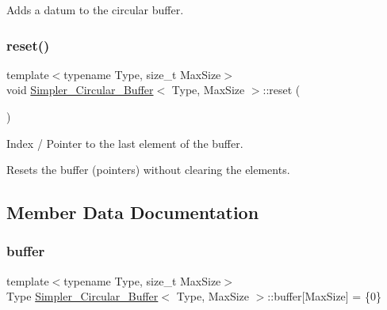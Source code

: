 Adds a datum to the circular buffer. 

\mbox{\label{classSimpler__Circular__Buffer_a793cdb8134afe48ef9918fa0428dfbb6}} 
\subsubsection{\texorpdfstring{reset()}{reset()}}
{\footnotesize\ttfamily template$<$typename Type, size\+\_\+t Max\+Size$>$ \\
void \hyperlink{classSimpler__Circular__Buffer}{Simpler\+\_\+\+Circular\+\_\+\+Buffer}$<$ Type, Max\+Size $>$\+::reset (\begin{DoxyParamCaption}{ }\end{DoxyParamCaption})\hspace{0.3cm}{\ttfamily [inline]}}



Index / Pointer to the last element of the buffer. 

Resets the buffer (pointers) without clearing the elements. 

\subsection{Member Data Documentation}
\mbox{\label{classSimpler__Circular__Buffer_a05808047d226985470e02e84b44bee9a}} 
\subsubsection{\texorpdfstring{buffer}{buffer}}
{\footnotesize\ttfamily template$<$typename Type, size\+\_\+t Max\+Size$>$ \\
Type \hyperlink{classSimpler__Circular__Buffer}{Simpler\+\_\+\+Circular\+\_\+\+Buffer}$<$ Type, Max\+Size $>$\+::buffer\mbox{[}Max\+Size\mbox{]} = \{0\}\hspace{0.3cm}{\ttfamily [private]}}

\mbox{\label{classSimpler__Circular__Buffer_aa6fea0e7b9d4b57aa825dfe11aec3c25}} 
